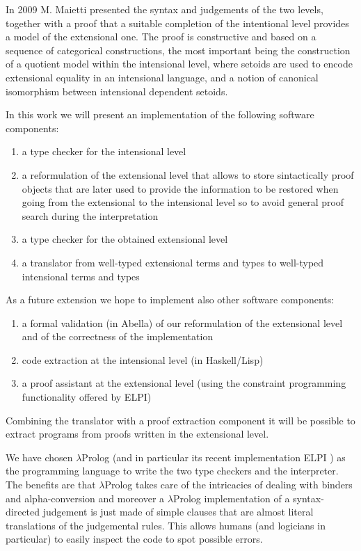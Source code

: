 In 2009 M. Maietti \cite{maietti2009minimalist} presented the syntax and judgements of the two levels, together with a proof that a suitable completion of the intentional level provides a model of the extensional one. The proof is constructive and based on a sequence of categorical constructions, the most important being the construction of a quotient model within the intensional level, where setoids are used to encode extensional equality in an intensional language, and a notion of canonical isomorphism between intensional dependent setoids.


In this work we will present an implementation of the following software components:
\begin{enumerate}
	\item a type checker for the intensional level
	\item a reformulation of the extensional level that allows to store sintactically proof objects that are later used to provide the information to be restored when going from the extensional to the intensional level so to avoid general proof search during the interpretation
	\item a type checker for the obtained extensional level
	\item a translator from well-typed extensional terms and types to well-typed intensional terms and types
\end{enumerate}


As a future extension we hope to implement also other software components:
\begin{enumerate}
	\item a formal validation (in Abella) of our reformulation of the extensional level and of the correctness of the implementation
	\item code extraction at the intensional level (in Haskell/Lisp)
	\item a proof assistant at the extensional level (using the constraint programming functionality offered by ELPI)
\end{enumerate}
Combining the translator with a proof extraction component it will be possible to extract programs from proofs written in the extensional level.

We have chosen $\lambda$Prolog \cite{nadathur1988overview} (and in particular its recent implementation ELPI \cite{dunchev2015elpi}) as the programming language to write the two type checkers and the interpreter. The benefits are that $\lambda$Prolog takes care of the intricacies of dealing with binders and alpha-conversion and moreover a $\lambda$Prolog implementation of a syntax-directed judgement is just made of simple clauses that are almost literal translations of the judgemental rules. This allows humans (and logicians in particular) to easily inspect the code to spot possible errors.










